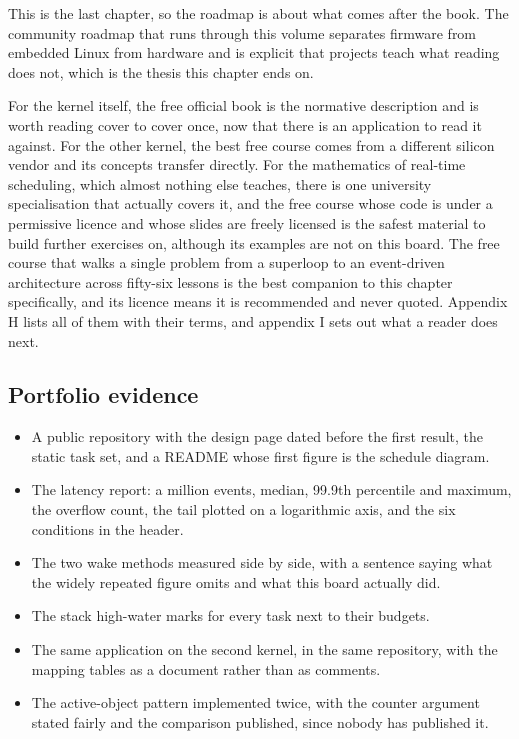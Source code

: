 This is the last chapter, so the roadmap is about what comes after the book.
The community roadmap that runs through this volume separates firmware from
embedded Linux from hardware and is explicit that projects teach what reading
does not, which is the thesis this chapter ends on.

For the kernel itself, the free official book is the normative description and
is worth reading cover to cover once, now that there is an application to read
it against. For the other kernel, the best free course comes from a different
silicon vendor and its concepts transfer directly. For the mathematics of
real-time scheduling, which almost nothing else teaches, there is one
university specialisation that actually covers it, and the free course whose
code is under a permissive licence and whose slides are freely licensed is the
safest material to build further exercises on, although its examples are not on
this board. The free course that walks a single problem from a superloop to an
event-driven architecture across fifty-six lessons is the best companion to
this chapter specifically, and its licence means it is recommended and never
quoted. Appendix H lists all of them with their terms, and appendix I sets out
what a reader does next.

\subsection*{Portfolio evidence}

\begin{itemize}
\item A public repository with the design page dated before the first result,
the static task set, and a README whose first figure is the schedule diagram.
\item The latency report: a million events, median, 99.9th percentile and
maximum, the overflow count, the tail plotted on a logarithmic axis, and the
six conditions in the header.
\item The two wake methods measured side by side, with a sentence saying what
the widely repeated figure omits and what this board actually did.
\item The stack high-water marks for every task next to their budgets.
\item The same application on the second kernel, in the same repository, with
the mapping tables as a document rather than as comments.
\item The active-object pattern implemented twice, with the counter argument
stated fairly and the comparison published, since nobody has published it.
\end{itemize}

